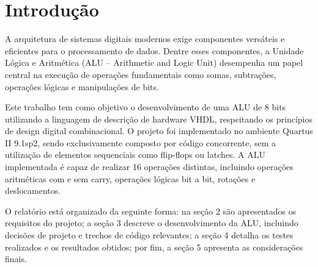 \section{Introdução}

A arquitetura de sistemas digitais modernos exige componentes versáteis e eficientes para o processamento de dados. Dentre esses componentes, a Unidade Lógica e Aritmética (ALU – Arithmetic and Logic Unit) desempenha um papel central na execução de operações fundamentais como somas, subtrações, operações lógicas e manipulações de bits.

Este trabalho tem como objetivo o desenvolvimento de uma ALU de 8 bits utilizando a linguagem de descrição de hardware VHDL, respeitando os princípios de design digital combinacional. O projeto foi implementado no ambiente Quartus II 9.1sp2, sendo exclusivamente composto por código concorrente, sem a utilização de elementos sequenciais como flip-flops ou latches. A ALU implementada é capaz de realizar 16 operações distintas, incluindo operações aritméticas com e sem carry, operações lógicas bit a bit, rotações e deslocamentos.

O relatório está organizado da seguinte forma: na seção 2 são apresentados os requisitos do projeto; a seção 3 descreve o desenvolvimento da ALU, incluindo decisões de projeto e trechos de código relevantes; a seção 4 detalha os testes realizados e os resultados obtidos; por fim, a seção 5 apresenta as considerações finais.